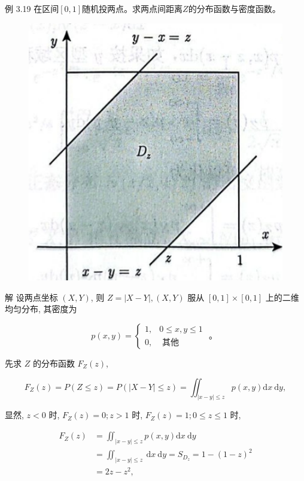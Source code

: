 \documentclass{beamer}
\begin{document}
	\begin{frame}
		例 3.19 在区间$[0, 1]$随机投两点。求两点间距离$Z$的分布函数与密度函数。
		\begin{figure}
			\centering
			\includegraphics[scale = 0.37]{figures/figure3-55.png}
		\end{figure}
	\end{frame}
	
	\begin{frame}
		解 设两点坐标 $(X, Y)$, 则 $Z=|X-Y|,(X, Y)$ 服从 $[0,1] \times[0,1]$ 上的二维均匀分布, 其密度为
		
		$$
		p(x, y)=\left\{\begin{array}{cc}
			1, & 0 \leqslant x, y \leqslant 1 \\
			0, & \text { 其他 }
		\end{array}\right. \text { 。 }
		$$
		
		先求 $Z$ 的分布函数 $F_{Z}(z)$,
		
		$$
		F_{Z}(z)=P(Z \leqslant z)=P(|X-Y| \leqslant z)=\iint_{|x-y| \leqslant z} p(x, y) \mathrm{d} x \mathrm{~d} y,
		$$
		
		显然, $z<0$ 时, $F_{Z}(z)=0 ; z>1$ 时, $F_{Z}(z)=1 ; 0 \leqslant z \leqslant 1$ 时,
		
		$$
		\begin{aligned}
			F_{Z}(z) & =\iint_{|x-y| \leqslant z} p(x, y) \mathrm{d} x \mathrm{~d} y \\
			& =\iint_{|x-y| \leqslant z} \mathrm{~d} x \mathrm{~d} y=S_{D_{z}}=1-(1-z)^{2} \\
			& =2 z-z^{2},
		\end{aligned}
		$$
	\end{frame}
	
\end{document}
